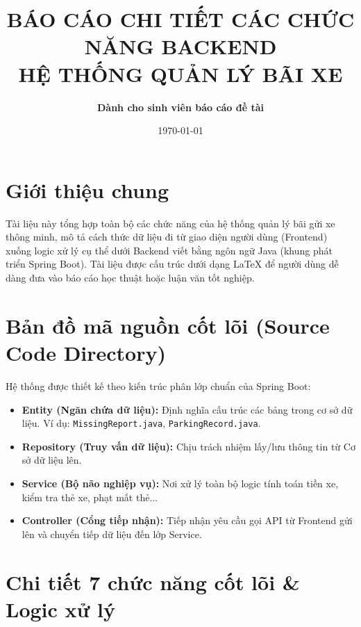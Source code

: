 \documentclass[12pt,a4paper]{article}
\title{\textbf{BÁO CÁO CHI TIẾT CÁC CHỨC NĂNG BACKEND\\HỆ THỐNG QUẢN LÝ BÃI XE}}
\author{\textbf{Dành cho sinh viên báo cáo đề tài}}
\date{\today}
\begin{document}
\maketitle
\tableofcontents
\newpage

\section{Giới thiệu chung}
Tài liệu này tổng hợp toàn bộ các chức năng của hệ thống quản lý bãi gửi xe thông minh, mô tả cách thức dữ liệu đi từ giao diện người dùng (Frontend) xuống logic xử lý cụ thể dưới Backend viết bằng ngôn ngữ Java (khung phát triển Spring Boot). Tài liệu được cấu trúc dưới dạng LaTeX để người dùng dễ dàng đưa vào báo cáo học thuật hoặc luận văn tốt nghiệp.

\section{Bản đồ mã nguồn cốt lõi (Source Code Directory)}
Hệ thống được thiết kế theo kiến trúc phân lớp chuẩn của Spring Boot:
\begin{itemize}
    \item \textbf{Entity (Ngăn chứa dữ liệu):} Định nghĩa cấu trúc các bảng trong cơ sở dữ liệu. Ví dụ: \texttt{MissingReport.java}, \texttt{ParkingRecord.java}.
    \item \textbf{Repository (Truy vấn dữ liệu):} Chịu trách nhiệm lấy/lưu thông tin từ Cơ sở dữ liệu lên.
    \item \textbf{Service (Bộ não nghiệp vụ):} Nơi xử lý toàn bộ logic tính toán tiền xe, kiểm tra thẻ xe, phạt mất thẻ...
    \item \textbf{Controller (Cổng tiếp nhận):} Tiếp nhận yêu cầu gọi API từ Frontend gửi lên và chuyển tiếp dữ liệu đến lớp Service.
\end{itemize}

\section{Chi tiết 7 chức năng cốt lõi \& Logic xử lý}
\end{document}
